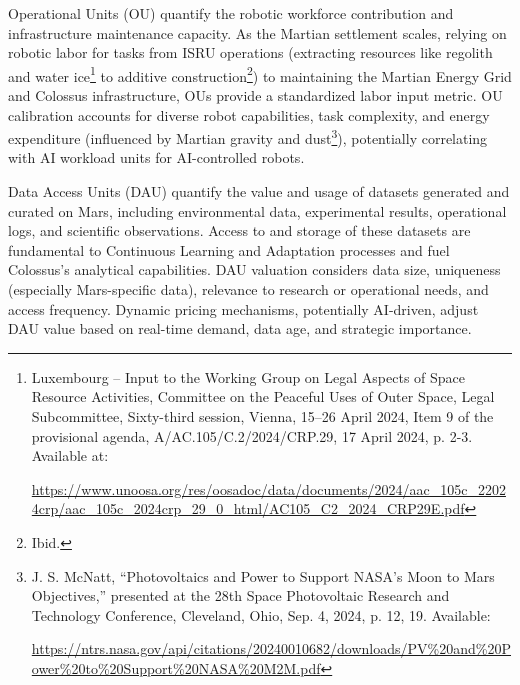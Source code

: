 \documentclass[fontsize=10pt, oneside, DIV=calc]{scrartcl}
\begin{document}
\noindent
Operational Units (OU) quantify the robotic workforce contribution and infrastructure maintenance capacity. As the Martian settlement scales, relying on robotic labor for tasks from ISRU operations (extracting resources like regolith and water ice\footnote{Luxembourg – Input to the Working Group on Legal Aspects of Space Resource Activities, Committee on the Peaceful Uses of Outer Space, Legal Subcommittee, Sixty-third session, Vienna, 15–26 April 2024, Item 9 of the provisional agenda, A/AC.105/C.2/2024/CRP.29, 17 April 2024, p. 2-3. Available at: 











\href{https://www.unoosa.org/res/oosadoc/data/documents/2024/aac\_105c\_22024crp/aac\_105c\_2024crp\_29\_0\_html/AC105\_C2\_2024\_CRP29E.pdf}\url{https://www.unoosa.org/res/oosadoc/data/documents/2024/aac\_105c\_22024crp/aac\_105c\_2024crp\_29\_0\_html/AC105\_C2\_2024\_CRP29E.pdf}} to additive construction\footnote{Ibid.}) to maintaining the Martian Energy Grid and Colossus infrastructure, OUs provide a standardized labor input metric. OU calibration accounts for diverse robot capabilities, task complexity, and energy expenditure (influenced by Martian gravity and dust\footnote{J. S. McNatt, ``Photovoltaics and Power to Support NASA’s Moon to Mars Objectives,'' presented at the 28th Space Photovoltaic Research and Technology Conference, Cleveland, Ohio, Sep. 4, 2024, p. 12, 19. Available: 











\href{https://ntrs.nasa.gov/api/citations/20240010682/downloads/PV\%20and\%20Power\%20to\%20Support\%20NASA\%20M2M.pdf}\url{https://ntrs.nasa.gov/api/citations/20240010682/downloads/PV\%20and\%20Power\%20to\%20Support\%20NASA\%20M2M.pdf}}), potentially correlating with AI workload units for AI-controlled robots.

\medskip

\noindent
Data Access Units (DAU) quantify the value and usage of datasets generated and curated on Mars, including environmental data, experimental results, operational logs, and scientific observations. Access to and storage of these datasets are fundamental to Continuous Learning and Adaptation processes and fuel Colossus's analytical capabilities. DAU valuation considers data size, uniqueness (especially Mars-specific data), relevance to research or operational needs, and access frequency. Dynamic pricing mechanisms, potentially AI-driven, adjust DAU value based on real-time demand, data age, and strategic importance.
\end{document}
